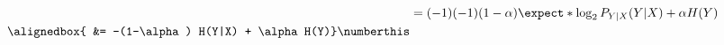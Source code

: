 \documentclass[
  coursecode={MTHE 474},
  assignmentname={Homework \homeworknumber},
  studentnumber=20053722,
  name={Bryan Hoang},
  draft,
]{
  ltxanswer%
}
\begin{document}
\begin{questions}
\begin{parts}
\begin{solution}
\begin{align*}
                       &= (-1)(-1) (1-\alpha) \expect*{\log_{2} P_{Y|X}(Y|X)} + \alpha H(Y)                                                                                                                                                                                     \\
          \alignedbox{ &= -(1-\alpha) H(Y|X) + \alpha H(Y)}\numberthis\label{eq:limit}                                                                                                                                                                                          \\
        \end{align*}
      \end{solution}

      \part{}
      \begin{solution}


\end{solution}
\end{parts}
\end{questions}
\end{document}
